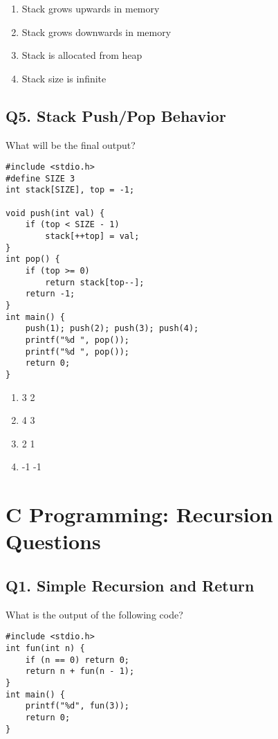 \begin{enumerate}[label=(\alph*)]
    \item Stack grows upwards in memory
    \item Stack grows downwards in memory
    \item Stack is allocated from heap
    \item Stack size is infinite
\end{enumerate}


\subsection*{Q5. Stack Push/Pop Behavior}
What will be the final output?

\begin{lstlisting}
#include <stdio.h>
#define SIZE 3
int stack[SIZE], top = -1;

void push(int val) {
    if (top < SIZE - 1)
        stack[++top] = val;
}
int pop() {
    if (top >= 0)
        return stack[top--];
    return -1;
}
int main() {
    push(1); push(2); push(3); push(4);
    printf("%d ", pop());
    printf("%d ", pop());
    return 0;
}
\end{lstlisting}

\begin{enumerate}[label=(\alph*)]
    \item 3 2
    \item 4 3
    \item 2 1
    \item -1 -1
\end{enumerate}


\newpage
\section{C Programming: Recursion Questions}

\subsection*{Q1. Simple Recursion and Return}
What is the output of the following code?

\begin{lstlisting}
#include <stdio.h>
int fun(int n) {
    if (n == 0) return 0;
    return n + fun(n - 1);
}
int main() {
    printf("%d", fun(3));
    return 0;
}
\end{lstlisting}

